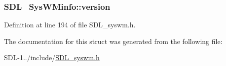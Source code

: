 \subsubsection[{version}]{ S\+D\+L\+\_\+\+Sys\+W\+Minfo\+::version}\label{struct_s_d_l___sys_w_minfo_ac3a70af022d4849e9ff546595e94627f}


Definition at line 194 of file S\+D\+L\+\_\+syswm.\+h.



The documentation for this struct was generated from the following file\+:\begin{DoxyCompactItemize}
\item 
S\+D\+L-\/1../include/\hyperlink{_s_d_l__syswm_8h}{S\+D\+L\+\_\+syswm.\+h}\end{DoxyCompactItemize}
